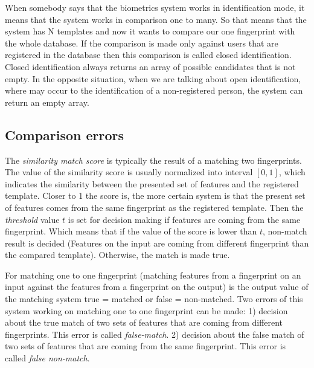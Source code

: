 When somebody says that the biometrics system works in identification mode, it means that the system works in comparison one to many. So that means that the system has N templates and now it wants to compare our one fingerprint with the whole database. If the comparison is made only against users that are registered in the database then this comparison is called closed identification. Closed identification always returns an array of possible candidates that is not empty. In the opposite situation, when we are talking about open identification, where may occur to the identification of a non-registered person, the system can return an empty array.\cite{maltoni2009handbook}

\subsection{Comparison errors}
The \emph{similarity match score} is typically the result of a matching two fingerprints. The value of the similarity score is usually normalized into interval $[0,1]$, which indicates the similarity between the presented set of features and the registered template. Closer to 1 the score is, the more certain system is that the present set of features comes from the same fingerprint as the registered template. Then the \emph{threshold} value $t$ is set for decision making if features are coming from the same fingerprint. Which means that if the value of the score is lower than $t$, non-match result is decided (Features on the input are coming from different fingerprint than the compared template). Otherwise, the match is made true.\cite{maltoni2009handbook}

For matching one to one fingerprint (matching features from a fingerprint on an input against the features from a fingerprint on the output) is the output value of the matching system true = matched or false = non-matched. Two errors of this system working on matching one to one fingerprint can be made: 1) decision about the true match of two sets of features that are coming from different fingerprints. This error is called \emph{false-match}. 2) decision about the false match of two sets of features that are coming from the same fingerprint. This error is called  \emph{false non-match}. \cite{maltoni2009handbook}

